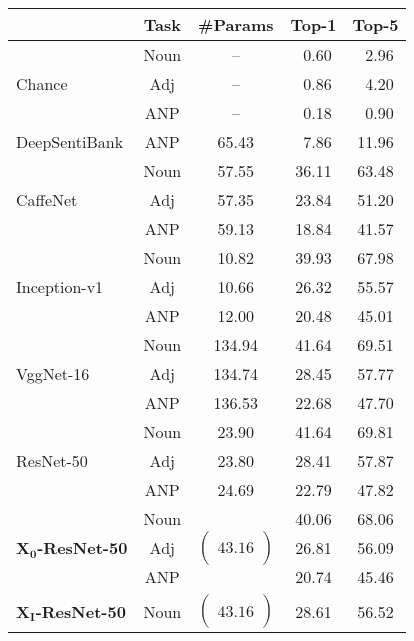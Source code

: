 \documentclass{sig-alternate-05-2015}
\newcommand{\mb}{\mathbf}
\begin{document}
\begin{table}[t]
  \centering
  \begin{tabular}{lcccc}
     & \textbf{Task} & \textbf{\#Params} & \textbf{Top-1} & \textbf{Top-5} \\ \hline
    \multirow{3}{*}{Chance} & Noun & -- & \,\,\,0.60 & \,\,\,2.96 \\
    & Adj & -- & \,\,\,0.86 & \,\,\,4.20 \\
    & ANP & -- & \,\,\,0.18 & \,\,\,0.90 \\ \hline
    DeepSentiBank \cite{chen_2014} & ANP & 65.43 & \,\,\,7.86 & 11.96 \\ \hline
    \multirow{3}{*}{CaffeNet \cite{jia_2014}} & Noun & 57.55 & 36.11 & 63.48 \\
    & Adj & 57.35 & 23.84 & 51.20 \\
    & ANP & 59.13 & 18.84 & 41.57 \\ \hline
    \multirow{3}{*}{Inception-v1 \cite{szegedy_2015}} & Noun & 10.82 & 39.93 & 67.98 \\
    & Adj & 10.66 & 26.32 & 55.57 \\
    & ANP & 12.00 & 20.48 & 45.01 \\ \hline
    \multirow{3}{*}{VggNet-16 \cite{simonyan_2015}} & Noun & 134.94 & 41.64 & 69.51 \\
    & Adj & 134.74 & 28.45 & 57.77 \\
    & ANP & 136.53 & 22.68 & 47.70 \\ \hline
    \multirow{3}{*}{ResNet-50 \cite{he_2016}} & Noun & 23.90 & 41.64 & 69.81 \\
    & Adj & 23.80 & 28.41 & 57.87 \\
    & ANP & 24.69 & 22.79 & 47.82 \\ \hline
    \multirow{3}{*}{\textbf{X$_{\mb 0}$-ResNet-50}} & Noun & \multirow{3}{*}{$\begin{pmatrix} \, \\ 43.16 \\ \, \end{pmatrix}$} & 40.06 & 68.06 \\
    & Adj & & 26.81 & 56.09 \\
    & ANP & & 20.74 & 45.46 \\ \hline
    \multirow{3}{*}{\textbf{X$_{\mb I}$-ResNet-50}} & Noun & \multirow{3}{*}{$\begin{pmatrix} \, \\ 43.16 \\ \, \end{pmatrix}$} & 28.61 & 56.52 \\

\end{tabular}
\end{table}
\end{document}
